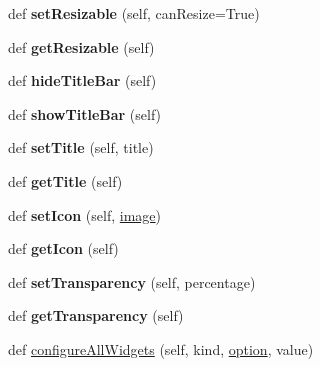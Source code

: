 \begin{DoxyCompactItemize}
\mbox{\label{classappjar_1_1gui_a7e2d5c77090519cbbdec0c1a51ec6a9c}} 
def {\bfseries set\+Resizable} (self, can\+Resize=True)
\item 
\mbox{\label{classappjar_1_1gui_ad766c62ac6965d79e42501489344d061}} 
def {\bfseries get\+Resizable} (self)
\item 
\mbox{\label{classappjar_1_1gui_a232bd1f3b1269d527e8bbd504f0d1aa7}} 
def {\bfseries hide\+Title\+Bar} (self)
\item 
\mbox{\label{classappjar_1_1gui_a96f959a03c44033d9b329607d56e29df}} 
def {\bfseries show\+Title\+Bar} (self)
\item 
\mbox{\label{classappjar_1_1gui_a5ccb06e27d9255027c7e6065dfcbc0fe}} 
def {\bfseries set\+Title} (self, title)
\item 
\mbox{\label{classappjar_1_1gui_ae659a898c117bc7028d72919d93c76bb}} 
def {\bfseries get\+Title} (self)
\item 
\mbox{\label{classappjar_1_1gui_ab4311d79ebb5b7f38560c02f14f8072d}} 
def {\bfseries set\+Icon} (self, \hyperlink{classappjar_1_1gui_a7bf059e8a509826c130aacb56902d593}{image})
\item 
\mbox{\label{classappjar_1_1gui_a9c3f959c58942265a96aec2b2e160415}} 
def {\bfseries get\+Icon} (self)
\item 
\mbox{\label{classappjar_1_1gui_a96cfd72a944b989aac0f0a0571483841}} 
def {\bfseries set\+Transparency} (self, percentage)
\item 
\mbox{\label{classappjar_1_1gui_a159e3c00dba5ed4e6dfb2be0e5f9528d}} 
def {\bfseries get\+Transparency} (self)
\item 
\mbox{\label{classappjar_1_1gui_a9c1d5a2ab2555b4889b1cbb9caf02d99}} 
def \hyperlink{classappjar_1_1gui_a9c1d5a2ab2555b4889b1cbb9caf02d99}{configure\+All\+Widgets} (self, kind, \hyperlink{classappjar_1_1gui_a641fb93f7f581e3fdd4357736f256f2c}{option}, value)

\end{DoxyCompactItemize}
